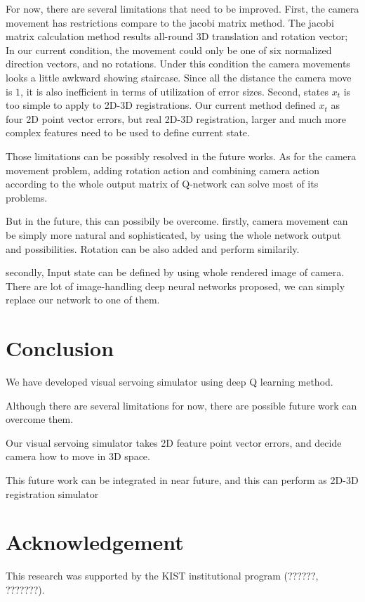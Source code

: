 \documentclass[10pt]{article}
\begin{document}
 For now, there are several limitations that need to be improved. First, the camera movement has restrictions compare to the jacobi matrix method. The jacobi matrix calculation method results all-round 3D translation and rotation vector; In our current condition, the movement could only be one of six normalized direction vectors, and no rotations. Under this condition the camera movements looks a little awkward showing staircase. Since all the distance the camera move is $1$, it is also inefficient in terms of utilization of error sizes. Second, states $x_t$ is too simple to apply to 2D-3D registrations. Our current method defined $x_t$ as four 2D point vector errors, but real 2D-3D registration, larger and much more complex features need to be used to define current state.

 Those limitations can be possibly resolved in the future works. As for the camera movement problem, adding rotation action and combining camera action according to the whole output matrix of Q-network can solve most of its problems.


But in the future, this can possibily be overcome.
firstly, camera movement can be simply more natural and sophisticated, by using the whole network output and possibilities.
Rotation can be also added and perform similarily.

secondly, Input state can be defined by using whole rendered image of camera. There are lot of image-handling deep neural networks proposed, we can simply replace our network to one of them.



\section{Conclusion}

We have developed visual servoing simulator using deep Q learning method.

Although there are several limitations for now, there are possible future work can overcome them.

Our visual servoing simulator takes 2D feature point vector errors, and decide camera how to move in 3D space.

This future work can be integrated in near future, and this can perform as 2D-3D registration simulator


\section*{Acknowledgement}
This research was supported by the KIST institutional program (??????, ???????).
\end{document}
